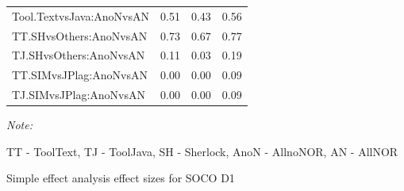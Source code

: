 \documentclass[a4paper, 12pt, oneside, openany, final, pdftex]{book}\usepackage[]{graphicx}\usepackage[]{color}
\begin{document}
\begin{appendices}
\begin{table}[ht]
\begin{threeparttable}
\begin{tabular}{lrrr}
Tool.TextvsJava:AnoNvsAN & 0.51 & 0.43 & 0.56\\
\rowcolor{gray!6}  TT.SHvsOthers:AnoNvsAN & 0.73 & 0.67 & 0.77\\
TJ.SHvsOthers:AnoNvsAN & 0.11 & 0.03 & 0.19\\
\rowcolor{gray!6}  TT.SIMvsJPlag:AnoNvsAN & 0.00 & 0.00 & 0.09\\
TJ.SIMvsJPlag:AnoNvsAN & 0.00 & 0.00 & 0.09\\
\bottomrule
\end{tabular}
\begin{tablenotes}
\item \textit{Note: } 
\item TT - ToolText, TJ - ToolJava, SH - Sherlock, AnoN - AllnoNOR, AN - AllNOR
\end{tablenotes}
\end{threeparttable}


\end{table}

\begin{table}
	\centering
	\caption{Simple effect analysis effect sizes for SOCO D1}\label{tbl:effectSizesSEASOCOD1}


\end{table}
\end{appendices}
\end{document}
